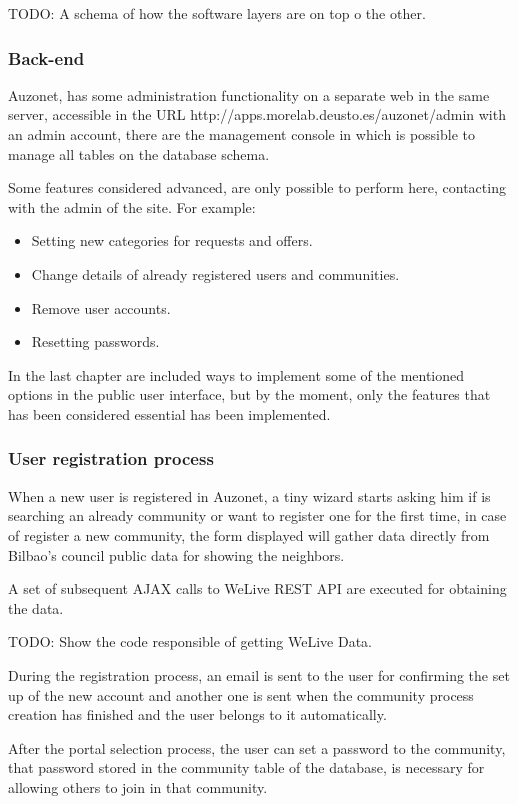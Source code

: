 \documentclass{DeustoFDP}
\begin{document}
TODO: A schema of how the software layers are on top o the other.

\subsubsection{Back-end}
Auzonet, has some administration functionality on a separate web in the same server, accessible in the URL http://apps.morelab.deusto.es/auzonet/admin with an admin account, there are the management console in which is possible to manage all tables on the database schema.

Some features considered advanced, are only possible to perform here, contacting with the admin of the site. For example:

\begin{itemize}
	\item Setting new categories for requests and offers.
	\item Change details of already registered users and communities.
	\item Remove user accounts.
	\item Resetting passwords.
\end{itemize}

In the last chapter are included ways to implement some of the mentioned options in the public user interface, but by the moment, only the features that has been considered essential has been implemented.

\subsubsection{User registration process}
When a new user is registered in Auzonet, a tiny wizard starts asking him if is searching an already community or want to register one for the first time, in case of register a new community, the form displayed will gather data directly from Bilbao's council public data for showing the neighbors.

A set of subsequent AJAX calls to WeLive REST API are executed for obtaining the data.

TODO: Show the code responsible of getting WeLive Data.

During the registration process, an email is sent to the user for confirming the set up of the new account and another one is sent when the community process creation has finished and the user belongs to it automatically.

After the portal selection process, the user can set a password to the community, that password stored in the community table of the database, is necessary for allowing others to join in that community.
\end{document}
